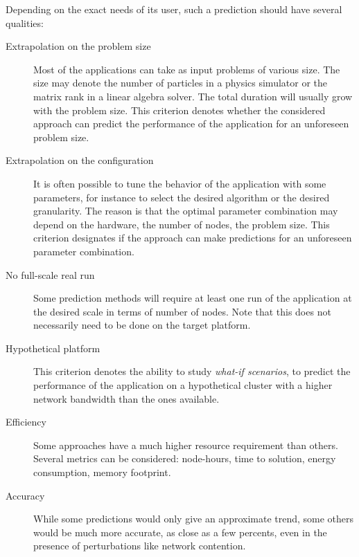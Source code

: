         Depending on the exact needs of its user, such a prediction should have several qualities:
        \begin{description}
            \item[Extrapolation on the problem size] Most of the applications can take as input problems of various
                size. The size may denote the number of particles in a physics simulator or the matrix rank in a linear
                algebra solver. The total duration will usually grow with the problem size. This criterion denotes
                whether the considered approach can predict the performance of the application for an unforeseen problem
                size.
            \item[Extrapolation on the configuration] It is often possible to tune the behavior of the application with
                some parameters, for instance to select the desired algorithm or the desired granularity. The reason is
                that the optimal parameter combination may depend on the hardware, the number of nodes, the problem
                size. This criterion designates if the approach can make predictions for an unforeseen parameter
                combination.
            \item[No full-scale real run] Some prediction methods will require at least one run of the application at
                the desired scale in terms of number of nodes. Note that this does not necessarily need to be done on
                the target platform.
            \item[Hypothetical platform] This criterion denotes the ability to study \emph{what-if scenarios}, \eg to
                predict the performance of the application on a hypothetical cluster with a higher network bandwidth
                than the ones available.
            \item[Efficiency] Some approaches have a much higher resource requirement than others. Several metrics can
                be considered: node-hours, time to solution, energy consumption, memory footprint.
            \item[Accuracy] While some predictions would only give an approximate trend, some others would be much more
                accurate, as close as a few percents, even in the presence of perturbations like network contention.
        \end{description}

